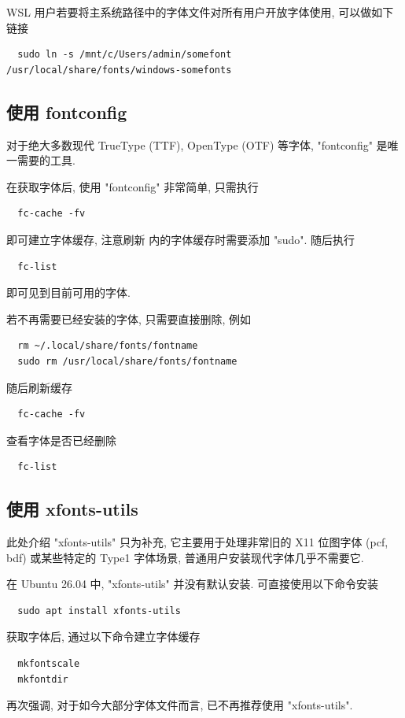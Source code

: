 WSL 用户若要将主系统路径中的字体文件对所有用户开放字体使用,
可以做如下链接
\begin{lstlisting}
  sudo ln -s /mnt/c/Users/admin/somefont /usr/local/share/fonts/windows-somefonts
\end{lstlisting}

\subsection{使用 fontconfig}

对于绝大多数现代 TrueType (TTF),
OpenType (OTF) 等字体,
"fontconfig" 是唯一需要的工具.

在获取字体后,
使用 "fontconfig" 非常简单,
只需执行
\begin{lstlisting}
  fc-cache -fv
\end{lstlisting}
即可建立字体缓存,
注意刷新  内的字体缓存时需要添加 "sudo".
随后执行
\begin{lstlisting}
  fc-list
\end{lstlisting}
即可见到目前可用的字体.

若不再需要已经安装的字体,
只需要直接删除,
例如
\begin{lstlisting}
  rm ~/.local/share/fonts/fontname
  sudo rm /usr/local/share/fonts/fontname
\end{lstlisting}
随后刷新缓存
\begin{lstlisting}
  fc-cache -fv
\end{lstlisting}
查看字体是否已经删除
\begin{lstlisting}
  fc-list
\end{lstlisting}

\subsection{使用 xfonts-utils}

此处介绍 "xfonts-utils" 只为补充,
它主要用于处理非常旧的 X11 位图字体 (pcf, bdf) 或某些特定的 Type1 字体场景,
普通用户安装现代字体几乎不需要它.

在 Ubuntu 26.04 中,
"xfonts-utils" 并没有默认安装.
可直接使用以下命令安装
\begin{lstlisting}
  sudo apt install xfonts-utils
\end{lstlisting}

获取字体后,
通过以下命令建立字体缓存
\begin{lstlisting}
  mkfontscale
  mkfontdir
\end{lstlisting}
再次强调,
对于如今大部分字体文件而言,
已不再推荐使用 "xfonts-utils".

